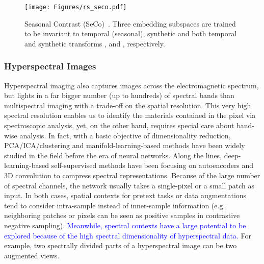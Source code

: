 \documentclass[lettersize,journal]{IEEEtran}
\begin{document}
\begin{figure}
\centering
\texttt{[image: Figures/rs\_seco.pdf]}
\caption[seco]{Seasonal Contrast (SeCo)~\cite{manas2021seasonal}. Three embedding subspaces are trained to be invariant to temporal (seasonal), synthetic and both temporal and synthetic transforms ,  and , respectively.}
\label{fig:seco}
\end{figure}

\subsubsection{Hyperspectral Images}

Hyperspectral imaging also captures images across the electromagnetic spectrum, but lights in a far bigger number (up to hundreds) of spectral bands than multispectral imaging with a trade-off on the spatial resolution. This very high spectral resolution enables us to identify the materials contained in the pixel via spectroscopic analysis, yet, on the other hand, requires special care about band-wise analysis. In fact, with a basic objective of dimensionality reduction, PCA/ICA/clustering and manifold-learning-based methods have been widely studied in the field before the era of neural networks. Along the lines, deep-learning-based self-supervised methods have been focusing on autoencoders and 3D convolution to compress spectral representations. Because of the large number of spectral channels, the network usually takes a single-pixel or a small patch as input. In both cases, spatial contexts for pretext tasks or data augmentations tend to consider intra-sample instead of inner-sample information (e.g., neighboring patches or pixels can be seen as positive samples in contrastive negative sampling). \textcolor{blue}{Meanwhile, spectral contexts have a large potential to be explored because of the high spectral dimensionality of hyperspectral data.} For example, two spectrally divided parts of a hyperspectral image can be two augmented views.
\end{document}
